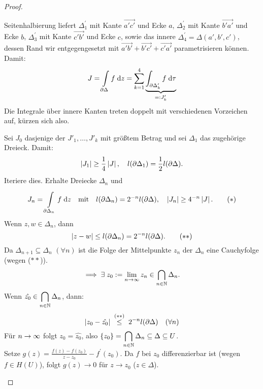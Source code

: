 \documentclass[a4paper,twoside,DIV15,BCOR12mm]{scrbook}
\begin{document}
\begin{proof}
\begin{enumerate}
\begin{center}
\begin{tikzpicture}[scale=3]
\end{tikzpicture}
\end{center}

Seitenhalbierung liefert $\Delta_1^\prime$ mit Kante $\overrightarrow{a' c'}$ und Ecke $a$, $\Delta_2^\prime$ mit Kante $\overrightarrow{b' a'}$ und Ecke $b$, $\Delta_3^\prime$ mit Kante $\overrightarrow{c' b'}$ und Ecke $c$, sowie das innere $\Delta_4^\prime = \Delta(a',b',c')$, dessen Rand wir entgegengesetzt mit $\overrightarrow{a'b'} + \overrightarrow{b'c'}+\overrightarrow{c' a'}$ parametrisieren können. Damit:
\[J=\Integral{\partial\Delta}{}{f}{z} = \sum_{k=1}^4\underbrace{\integral{\partial\Delta'_k}{}{f}{\tau}}_{\ad J'_k}\]
Die Integrale über innere Kanten treten doppelt mit verschiedenen Vorzeichen auf, kürzen sich also.

Sei $J_0$ dasjenige der $J'_1,\dotsc,J'_k$ mit größtem Betrag und sei $\Delta_1$ das zugehörige Dreieck. Damit:
\[\abs{J_1}\geq\frac{1}{4}\abs{J},\quad l(\partial\Delta_1)=\frac{1}{2}l(\partial\Delta).\]
Iteriere dies. Erhalte Dreiecke $\Delta_n$ und
\[J_n = \Integral{\partial\Delta_n}{}{f}{z}\quad\text{mit}\quad l(\partial\Delta_n)=2^{-n}l(\partial\Delta),\quad\abs{J_n}\geq 4^{-n}\abs{J}.\tag{$*$}\]
Wenn $z,w\in\Delta_n$, dann
\[\abs{z-w}\leq l(\partial\Delta_n) = 2^{-n}l(\partial\Delta).\tag{$**$}\]
Da $\Delta_{n+1}\subseteq \Delta_n$ $(\forall n)$ ist die Folge der Mittelpunkte $z_n$ der $\Delta_n$ eine Cauchyfolge (wegen ($**$)).
\[\folgt\exists\; z_0\da \lim_{n\ra\infty}z_n\in\bigcap_{\nat{n}}\Delta_n.\]
Wenn $\displaystyle \hat{z_0}\in\bigcap_{\nat{n}}\Delta_n$, dann:
\[\abs{z_0-\hat{z_0}}\wegen{\leq}{(**)}2^{-n}l(\partial\Delta)\quad(\forall n)\]
Für $n\ra\infty$ folgt $z_0 = \hat{z_0}$, also $\displaystyle\{z_0\}=\bigcap_{\nat{n}}\Delta_n\subseteq\Delta\subseteq U$.\\
Setze $\displaystyle g(z)=\frac{f(z)-f(z_0)}{z-z_0}-f^\prime(z_0)$. Da $f$ bei $z_0$ differenzierbar ist (wegen $f\in H(U)$),
folgt $g(z)\to0$ für $z\to z_0$ ($z\in\Delta$).


\end{enumerate}
\end{proof}
\end{document}
